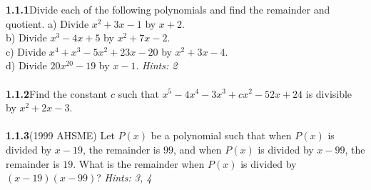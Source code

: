 \documentclass[12pt]{article}
\begin{document}
\textbf{1.1.1}\quad Divide each of the following polynomials and find the remainder and quotient.
\indent a) Divide $x^2+3x-1$ by $x+2$.\\
\indent b) Divide $x^3-4x+5$ by $x^2+7x-2$.\\
\indent c) Divide $x^4+x^3-5x^2+23x-20$ by $x^2+3x-4$.\\
\indent d) Divide $20x^{20}-19$ by $x-1$. \textit{Hints: 2}\\\\
\textbf{1.1.2}\quad Find the constant $c$ such that $x^5-4x^4-3x^3+cx^2-52x+24$ is divisible by $x^2+2x-3$.\\\\
\textbf{1.1.3}\quad (1999 AHSME) Let $P(x)$ be a polynomial such that when $P(x)$ is divided by $x-19$, the remainder is $99$, and when $P(x)$ is divided by $x - 99$, the remainder is $19$. What is the remainder when $P(x)$ is divided by $(x-19)(x-99)$? \textit{Hints: 3, 4} \\\\
\\\\
\end{document}
